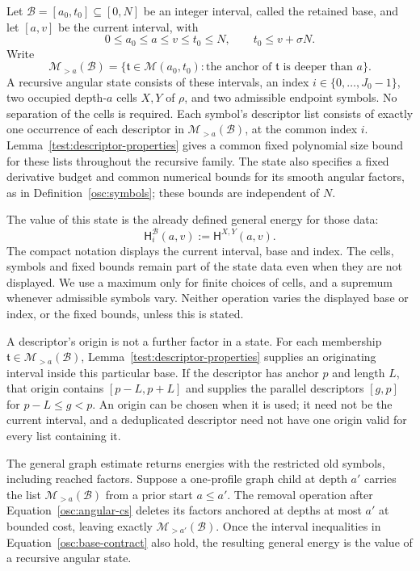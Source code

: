 \begin{definition}\label{rec:angular-state}
Let $\mathcal B=[a_0,t_0]\subseteq[0,N]$ be an integer interval, called
the retained base, and let $[a,v]$ be the current interval, with
\begin{equation}\label{osc:base-contract}
 0\le a_0\le a\le v\le t_0\le N,
 \qquad t_0\le v+\sigma N.
\end{equation}
Write
\[
 \mathcal M_{>a}(\mathcal B)=
 \{\mathfrak t\in\mathcal M(a_0,t_0):
                 \text{the anchor of }\mathfrak t\text{ is deeper than }a\}.
\]
A recursive angular state consists of these intervals, an index
$i\in\{0,\ldots,J_0-1\}$, two occupied depth-$a$ cells $X,Y$ of
$\rho$, and two admissible endpoint symbols.  No separation of the cells
is required.  Each symbol's descriptor list consists of exactly one occurrence of each descriptor in
$\mathcal M_{>a}(\mathcal B)$, at the common index $i$.
Lemma~\ref{test:descriptor-properties} gives a common fixed polynomial
size bound for these lists throughout the recursive family.  The state also
specifies a fixed derivative budget and common numerical bounds for its
smooth angular factors, as in Definition~\ref{osc:symbols}; these bounds
are independent of $N$.

The value of this state is the already defined general energy for those
data:
\[
 \mathsf H_i^{\mathcal B}(a,v):=\mathsf H^{X,Y}(a,v).
\]
The compact notation displays the current interval, base and index.  The
cells, symbols and fixed bounds remain part of the state data even when
they are not displayed.  We use a maximum only for finite choices of cells,
and a supremum whenever admissible symbols vary.  Neither operation varies
the displayed base or index, or the fixed bounds, unless this is stated.
\end{definition}

A descriptor's origin is not a further factor in a state.  For each
membership $\mathfrak t\in\mathcal M_{>a}(\mathcal B)$,
Lemma~\ref{test:descriptor-properties} supplies an originating interval
inside this particular base.  If the descriptor has anchor $p$ and
length $L$, that origin contains $[p-L,p+L]$ and supplies the parallel
descriptors $[g,p]$ for $p-L\le g<p$.  An origin can be chosen when it is
used; it need not be the current interval, and a deduplicated descriptor
need not have one origin valid for every list containing it.

The general graph estimate returns energies with the restricted old
symbols, including reached factors.  Suppose a one-profile graph child at
depth $a'$ carries the list $\mathcal M_{>a}(\mathcal B)$ from a prior
start $a\le a'$.  The removal operation after
Equation~\eqref{osc:angular-cs} deletes its factors anchored at depths at
most $a'$ at bounded cost, leaving exactly
$\mathcal M_{>a'}(\mathcal B)$.  Once the interval inequalities in
Equation~\eqref{osc:base-contract} also hold, the resulting general energy
is the value of a recursive angular state.

